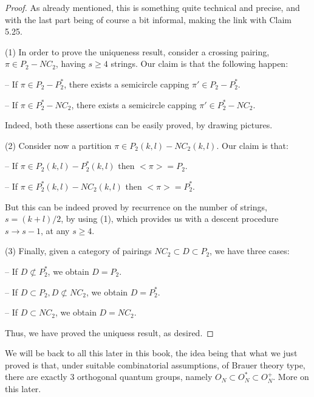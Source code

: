\documentclass[12pt]{amsbook}
\begin{document}
\begin{proof}
As already mentioned, this is something quite technical and precise, and with the last part being of course a bit informal, making the link with Claim 5.25.

\medskip

(1) In order to prove the uniqueness result, consider a crossing pairing, $\pi\in P_2-NC_2$, having $s\geq 4$ strings. Our claim is that the following happen:

\medskip

-- If $\pi\in P_2-P_2^*$, there exists a semicircle capping $\pi'\in P_2-P_2^*$.

\smallskip

-- If $\pi\in P_2^*-NC_2$, there exists a semicircle capping $\pi'\in P_2^*-NC_2$.

\medskip

Indeed, both these assertions can be easily proved, by drawing pictures.

\medskip

(2) Consider now a partition $\pi\in P_2(k,l)-NC_2(k,l)$. Our claim is that:

\medskip

-- If $\pi\in P_2(k, l)-P_2^*(k,l)$ then $<\pi>=P_2$.

\smallskip

-- If $\pi\in P_2^*(k,l)-NC_2(k,l)$ then $<\pi>=P_2^*$.

\medskip

But this can be indeed proved by recurrence on the number of strings, $s=(k+l)/2$, by using (1), which provides us with a descent procedure $s\to s-1$, at any $s\geq4$.

\medskip

(3) Finally, given a category of pairings $NC_2\subset D\subset P_2$, we have three cases:

\medskip

-- If $D\not\subset P_2^*$, we obtain $D=P_2$.

\smallskip

-- If $D\subset P_2,D\not\subset NC_2$, we obtain $D=P_2^*$.

\smallskip

-- If $D\subset NC_2$, we obtain $D=NC_2$.

\medskip

Thus, we have proved the uniquess result, as desired.
\end{proof}

We will be back to all this later in this book, the idea being that what we just proved is that, under suitable combinatorial assumptions, of Brauer theory type, there are exactly 3 orthogonal quantum groups, namely $O_N\subset O_N^*\subset O_N^+$. More on this later. 
\end{document}
